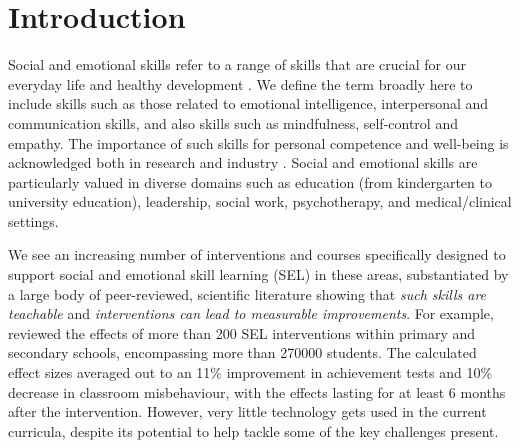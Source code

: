 \documentclass[prodmode,acmtochi]{acmsmall}
\begin{document}
\section{Introduction}
 
 
Social and emotional skills refer to a range of skills that are crucial for our everyday life and healthy development \cite{Weare2011,Adi2007a,Damon2006}. We define the term broadly here to include skills such as those related to emotional intelligence, interpersonal and communication skills, and also skills such as mindfulness, self-control and empathy. The importance of such skills for personal competence and well-being is acknowledged both in research and industry \cite{Durlak2011,Greenberg2010,Stepien2006,Barth2011,Carey2011,Bono2009}. Social and emotional skills are particularly valued in diverse domains such as education (from kindergarten to university education), leadership, social work, psychotherapy, and medical/clinical settings. 

We see an increasing number of interventions and courses specifically designed to support social and emotional skill learning (SEL) in these areas, substantiated by a large body of peer-reviewed, scientific literature showing that \emph{such skills are teachable} and \emph{interventions can lead to measurable improvements}. For example,  reviewed the effects of more than 200 SEL interventions within primary and secondary schools, encompassing more than 270000 students. The calculated effect sizes averaged out to an 11\% improvement in achievement tests and %
10\% decrease in classroom misbehaviour, with the effects lasting for at least 6 months after the intervention. However, very little technology gets used in the current curricula, despite its potential to help tackle some of the key challenges present.
\end{document}

